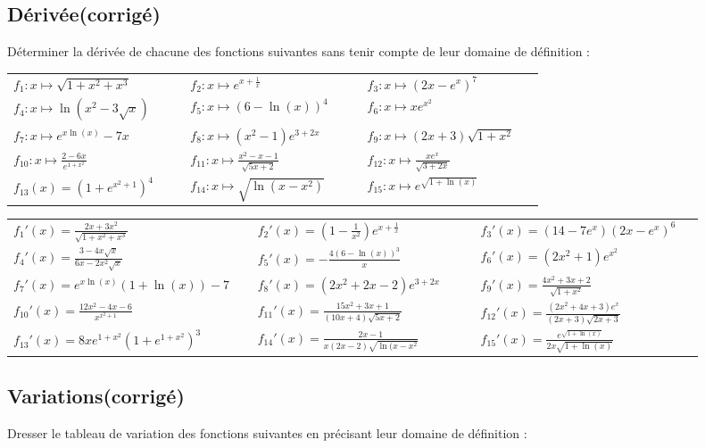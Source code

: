 \documentclass[oneside,12pt]{book}          %
\begin{document}
\subsection{Dérivée\quad\small{(corrigé)}}
Déterminer la dérivée de chacune des fonctions suivantes sans tenir compte de leur domaine de définition :

\begin{tabular}{p{0.3\linewidth}p{0.3\linewidth}p{0.3\linewidth}}
$f_1:x\mapsto\sqrt{1+x^2+x^3}$ & $f_2:x\mapsto e^{x+\frac{1}{x}}$ & $f_3:x\mapsto (2x-e^x)^7$\\
$f_4:x\mapsto \ln\left(x^2-3\sqrt{x}\right)$ & $f_5:x\mapsto\left(6-\ln(x)\right)^4$ & $f_6:x\mapsto xe^{x^2}$\\
$f_7:x\mapsto e^{x\ln(x)}-7x$ & $f_8:x\mapsto (x^2-1)e^{3+2x}$ & $f_9:x\mapsto(2x+3)\sqrt{1+x^2}$ \\
$f_{10}:x\mapsto \frac{2-6x}{e^{1+x^2}}$ & $f_{11}:x\mapsto \frac{x^2-x-1}{\sqrt{5x+2}}$ & $f_{12}:x\mapsto\frac{xe^x}{\sqrt{3+2x}}$\\
$f_{13}(x)= \left(1+e^{x^2+1}\right)^{4}$ & $f_{14}:x\mapsto \sqrt{\ln(x-x^2)}$ & $f_{15}:x\mapsto e^{\sqrt{1+\ln(x)}}$
\end{tabular}

\begin{sol}
\renewcommand{\arraystretch}{2}
	\begin{tabular}{p{0.3\linewidth}p{0.3\linewidth}p{0.3\linewidth}}
	$f_1'(x)=\frac{2x+3x^2}{\sqrt{1+x^2+x^3}}$ & $f_2'(x)=\left(1-\frac{1}{x^2}\right)e^{x+\frac{1}{x}}$ & $f_3'(x)=\left(14-7e^x\right)(2x-e^x)^6$ \\
	$f_4'(x)=\frac{3-4x\sqrt{x}}{6x-2x^2\sqrt{x}}$ & $f_5'(x)=-\frac{4\left(6-\ln(x)\right)^3}{x}$ & $f_6'(x)=\left(2x^2+1\right)e^{x^2}$ \\
	$f_7'(x)=e^{x\ln(x)}(1+\ln(x))-7$ & $f_8'(x)=(2x^2+2x-2)e^{3+2x}$ & $f_9'(x)=\frac{4x^2+3x+2}{\sqrt{1+x^2}}$ \\	
	$f_{10}'(x)=\frac{12x^2-4x-6}{x^{x^2+1}}$ & $f_{11}'(x)=\frac{15x^2+3x+1}{(10x+4)\sqrt{5x+2}}$ & $f_{12}'(x)=\frac{(2x^2+4x+3)e^x}{(2x+3)\sqrt{2x+3}}$ \\
	$f_{13}'(x)=8xe^{1+x^2}\left(1+e^{1+x^2}\right)^{3}$ & $f_{14}'(x)=\frac{2x-1}{x(2x-2)\sqrt{\ln(x-x^2}}$ & $f_{15}'(x)=\frac{e^{\sqrt{1+\ln(x)}}}{2x\sqrt{1+\ln(x)}}$
\end{tabular}
\end{sol}



\subsection{Variations\quad\small{(corrigé)}}
Dresser le tableau de variation des fonctions suivantes en précisant leur domaine de définition :
\end{document}
